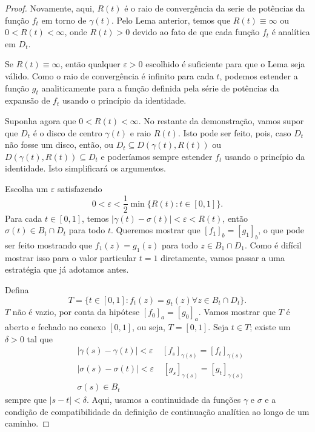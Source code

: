 \begin{proof}
Novamente, aqui, $R(t)$ é o raio de convergência da serie de potências da função $f_t$ em torno de $\gamma(t)$. Pelo Lema anterior, temos que $R(t) \equiv \infty$ ou $0 < R(t) < \infty$, onde $R(t) > 0$ devido ao fato de que cada função $f_t$ é analítica em $D_t$. 

Se $R(t) \equiv \infty$, então qualquer $\varepsilon > 0$ escolhido é suficiente para que o Lema seja válido. Como o raio de convergência é infinito para cada $t$, podemos estender a função $g_t$ analiticamente para a função definida pela série de potências da expansão de $f_t$ usando o princípio da identidade.

Suponha agora que $0 < R(t) < \infty$. No restante da demonstração, vamos supor que $D_t$ é o disco de centro $\gamma(t)$ e raio $R(t)$. Isto pode ser feito, pois, caso $D_t$ não fosse um disco, então, ou $D_t \subseteq D(\gamma(t),R(t))$ ou $D(\gamma(t),R(t)) \subseteq D_t$ e poderíamos sempre estender $f_t$ usando o princípio da identidade. Isto simplificará os argumentos.

Escolha um $\varepsilon$ satisfazendo
$$0 < \varepsilon < \frac{1}{2}\min\{R(t): t \in [0,1]\}.$$
Para cada $t \in [0,1]$, temos $|\gamma(t) - \sigma(t)| < \varepsilon < R(t)$, então $\sigma(t) \in B_t \cap D_t$ para todo $t$. Queremos mostrar que $[f_1]_b = [g_1]_b$, o que pode ser feito mostrando que $f_1(z) = g_1(z)$ para todo $z \in B_1 \cap D_1$. Como é difícil mostrar isso para o valor particular $t=1$ diretamente, vamos passar a uma estratégia que já adotamos antes.

Defina
$$T = \{t \in [0,1]: f_t(z) = g_t(z) \forall z \in B_t \cap D_t\}.$$
$T$ não é vazio, por conta da hipótese $[f_0]_a = [g_0]_a$. Vamos mostrar que $T$ é aberto e fechado no conexo $[0,1]$, ou seja, $T = [0,1]$. Seja $t \in T$; existe um $\delta > 0$ tal que
\begin{align}
\label{Eq5}
    &|\gamma(s) - \gamma(t)| < \varepsilon \ \ \ \ \ [f_s]_{\gamma(s)} = [f_t]_{\gamma(s)} \\
    &|\sigma(s) - \sigma(t)| < \varepsilon \ \ \ \ \ [g_s]_{\gamma(s)} = [g_t]_{\gamma(s)} \\
    &\sigma(s) \in B_t
\end{align}
sempre que $|s-t|<\delta$. Aqui, usamos a continuidade da funções $\gamma$ e $\sigma$ e a condição de compatibilidade da definição de continuação analítica ao longo de um caminho.


\end{proof}
